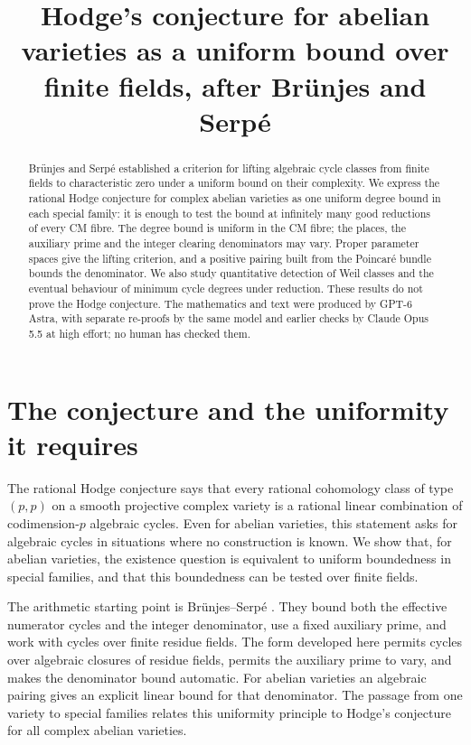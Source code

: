 \documentclass[11pt]{article}
\title{Hodge's conjecture for abelian varieties as a uniform bound over finite fields, after Br\"unjes and Serp\'e}
\author{}
\date{}
\theoremstyle{definition}
\theoremstyle{remark}
\begin{document}
\maketitle
\begin{abstract}
Br\"unjes and Serp\'e established a criterion for lifting algebraic cycle classes from finite fields to characteristic zero under a uniform bound on their complexity. We express the rational Hodge conjecture for complex abelian varieties as one uniform degree bound in each special family: it is enough to test the bound at infinitely many good reductions of every CM fibre. The degree bound is uniform in the CM fibre; the places, the auxiliary prime and the integer clearing denominators may vary. Proper parameter spaces give the lifting criterion, and a positive pairing built from the Poincar\'e bundle bounds the denominator. We also study quantitative detection of Weil classes and the eventual behaviour of minimum cycle degrees under reduction. These results do not prove the Hodge conjecture. The mathematics and text were produced by GPT-6 Astra, with separate re-proofs by the same model and earlier checks by Claude Opus 5.5 at high effort; no human has checked them.
\end{abstract}

\section{The conjecture and the uniformity it requires}
\label{sec:introduction}

The rational Hodge conjecture says that every rational cohomology class of type $(p,p)$ on a smooth projective complex variety is a rational linear combination of codimension-$p$ algebraic cycles. Even for abelian varieties, this statement asks for algebraic cycles in situations where no construction is known. We show that, for abelian varieties, the existence question is equivalent to uniform boundedness in special families, and that this boundedness can be tested over finite fields.

The arithmetic starting point is Br\"unjes--Serp\'e \cite[Definition 2.3(ii), p.~4; Theorem 3.4, p.~8]{BS}. They bound both the effective numerator cycles and the integer denominator, use a fixed auxiliary prime, and work with cycles over finite residue fields. The form developed here permits cycles over algebraic closures of residue fields, permits the auxiliary prime to vary, and makes the denominator bound automatic. For abelian varieties an algebraic pairing gives an explicit linear bound for that denominator. The passage from one variety to special families relates this uniformity principle to Hodge's conjecture for all complex abelian varieties.
\end{document}
